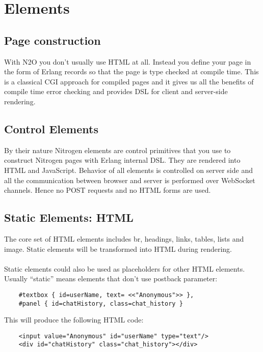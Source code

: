 \section{Elements}

\subsection{Page construction}
With N2O you don't usually use HTML at all. Instead you define your page
in the form of Erlang records so that the page is type checked at compile time.
This is a classical CGI approach for compiled pages and it gives us all the benefits of
compile time error checking and provides DSL for client and server-side rendering.

\subsection{Control Elements}
By their nature Nitrogen elements are control primitives
that you use to construct Nitrogen pages with Erlang internal DSL.
They are rendered into HTML and JavaScript.
Behavior of all elements is controlled on server side and all the communication
between browser and server is performed over WebSocket channels.
Hence no POST requests and no HTML forms are used.

\subsection{Static Elements: HTML}
The core set of HTML elements includes br, headings, links, tables, lists and image.
Static elements will be transformed into HTML during rendering.

\paragraph{}
Static elements could also be used as placeholders for other HTML elements.
Usually ``static'' means elements that don't use postback parameter:

\vspace{1\baselineskip}
\begin{lstlisting}
    #textbox { id=userName, text= <<"Anonymous">> },
    #panel { id=chatHistory, class=chat_history }
\end{lstlisting}
\vspace{1\baselineskip}

This will produce the following HTML code:

\vspace{1\baselineskip}
\begin{lstlisting}
    <input value="Anonymous" id="userName" type="text"/>
    <div id="chatHistory" class="chat_history"></div>
\end{lstlisting}
\vspace{1\baselineskip}

